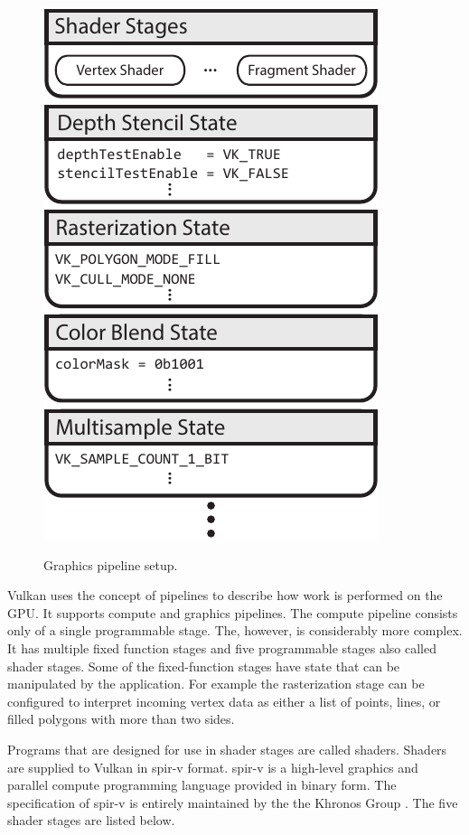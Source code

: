     \begin{figure}
      \caption{Graphics pipeline setup.}
      \centering
      \includegraphics{Main/Images/GraphicsPipeline}
      \label{fig:GraphicsPipeline}
    \end{figure}


    Vulkan uses the concept of pipelines to describe how work is performed on the GPU. It supports compute and graphics pipelines. The compute pipeline consists only of a single programmable stage. The, however, is considerably more complex. It has multiple fixed function stages and five programmable stages also called shader stages. Some of the fixed-function stages have state that can be manipulated by the application. For example the rasterization stage can be configured to interpret incoming vertex data as either a list of points, lines, or filled polygons with more than two sides.

    Programs that are designed for use in shader stages are called shaders. Shaders are supplied to Vulkan in \acrfull{spir-v} format. \acrshort{spir-v} is a high-level graphics and parallel compute programming language provided in binary form. The specification of \acrshort{spir-v} is entirely maintained by the the Khronos Group \cite{spirvspecprov}. The five shader stages are listed below.

